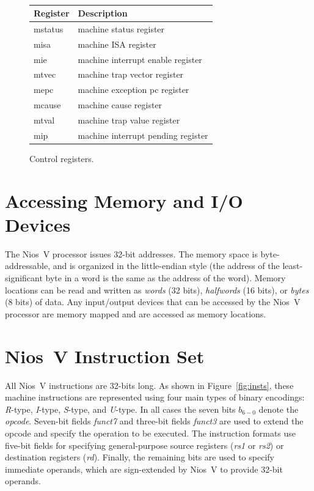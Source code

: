 \documentclass[11pt, twoside, pdftex]{article}
\begin{document}
~~\
\begin{figure}[H]
\begin{center}
\begin{tabular}{|l|l|} \hline 
\rule{0in}{0.1in}{\bf Register} & {\bf Description} \\ \hline
mstatus & machine status register \\
misa & machine ISA register \\
mie & machine interrupt enable register \\
mtvec & machine trap vector register \\
mepc & machine exception pc register \\
mcause & machine cause register \\
mtval & machine trap value register \\
mip & machine interrupt pending register \\ \hline
\end{tabular}
\end{center}
	\caption{Control registers.}
	\label{fig:ctrl_regs}
\end{figure}

\section{Accessing Memory and I/O Devices}

The Nios~V processor issues 32-bit addresses. The memory space is byte-addressable, and is
organized in the little-endian style (the address of the least-significant byte in a word is
the same as the address of the word). 
Memory locations can be read and written as {\it words} (32 bits), {\it halfwords} (16 bits),
or {\it bytes} (8 bits) of data.
Any input/output devices that can be accessed by the
Nios~V processor are memory mapped and are accessed as memory locations. 

\section{Nios~V Instruction Set}

All Nios~V instructions are 32-bits long.  As shown in Figure~\ref{fig:insts}, 
these machine instructions are represented using four main types of binary encodings: 
{\it R}-type, {\it I}-type, {\it S}-type, and {\it U}-type. In all cases the seven 
bits $b_{6-0}$ denote the {\it opcode}. Seven-bit fields {\it funct7} and three-bit fields
{\it funct3} are used to extend the opcode and specify the operation to be executed.
The instruction formats use five-bit fields for specifying general-purpose source registers
({\it rs1} or {\it rs2}) or destination registers ({\it rd}). Finally, the 
remaining bits are used to specify immediate operands, which are sign-extended by Nios~V
to provide 32-bit operands.
\end{document}
